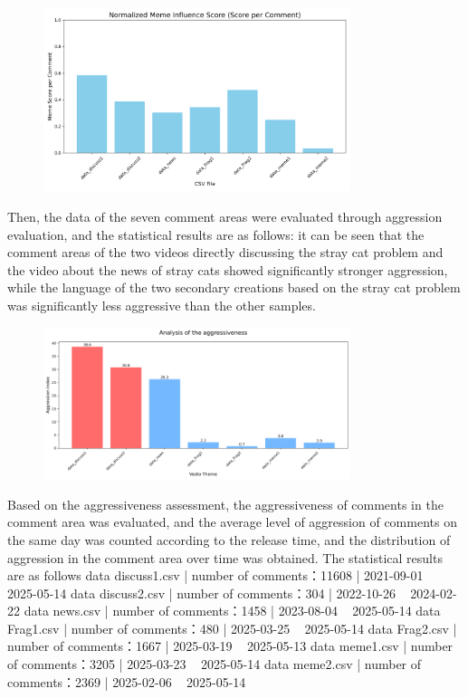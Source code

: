 \documentclass[12pt,a4paper]{ctexart}
\theoremstyle{MyLineTheoremStyle}
\theoremstyle{MyBlockTheoremStyle}
\theoremstyle{MySubsubsectionStyle}
\begin{document}
\begin{figure}[htbp]
    \centering
    \includegraphics[width=0.8\textwidth]{img/meme_score.png}
\end{figure}
\newpage

Then, the data of the seven comment areas were evaluated through aggression evaluation, and the statistical results are as follows: it can be seen that the comment areas of the two videos directly discussing the stray cat problem and the video about the news of stray cats showed significantly stronger aggression, while the language of the two secondary creations based on the stray cat problem was significantly less aggressive than the other samples.

\begin{figure}[htbp]
    \centering
    \includegraphics[width=0.8\textwidth]{img/aggressive_analysis.png}
\end{figure}
\newpage

Based on the aggressiveness assessment, the aggressiveness of comments in the comment area was evaluated, and the average level of aggression of comments on the same day was counted according to the release time, and the distribution of aggression in the comment area over time was obtained.
The statistical results are as follows
data discuss1.csv | number of comments：11608 | 2021-09-01 ~ 2025-05-14
data discuss2.csv | number of comments：304 | 2022-10-26 ~ 2024-02-22
data news.csv | number of comments：1458 | 2023-08-04 ~ 2025-05-14
data Frag1.csv | number of comments：480 | 2025-03-25 ~ 2025-05-14
data Frag2.csv | number of comments：1667 | 2025-03-19 ~ 2025-05-13
data meme1.csv | number of comments：3205 | 2025-03-23 ~ 2025-05-14
data meme2.csv | number of comments：2369 | 2025-02-06 ~ 2025-05-14
\end{document}

